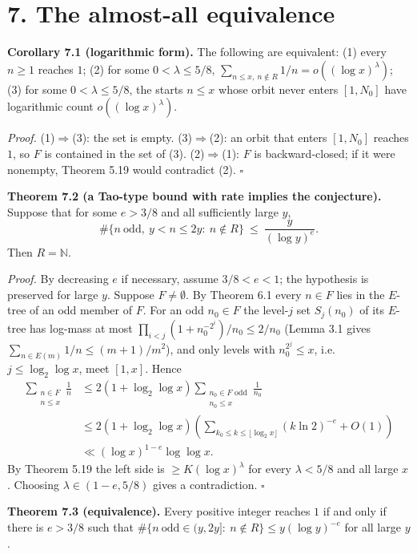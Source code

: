 \documentclass[11pt,a4paper]{article}
\begin{document}
\section{7. The almost-all
equivalence}\label{the-almost-all-equivalence}

\textbf{Corollary 7.1 (logarithmic form).} The following are equivalent:
(1) every \(n\ge 1\) reaches \(1\); (2) for some \(0<\lambda\le5/8\),
\(\sum_{n\le x,\ n\notin R}1/n=o((\log x)^{\lambda})\); (3) for some
\(0<\lambda\le5/8\), the starts \(n\le x\) whose orbit never enters
\([1,N_0]\) have logarithmic count \(o((\log x)^{\lambda})\).

\emph{Proof.} (1)\(\Rightarrow\)(3): the set is empty.
(3)\(\Rightarrow\)(2): an orbit that enters \([1,N_0]\) reaches \(1\),
so \(F\) is contained in the set of (3). (2)\(\Rightarrow\)(1): \(F\) is
backward-closed; if it were nonempty, Theorem 5.19 would contradict (2).
\(\square\)

\textbf{Theorem 7.2 (a Tao-type bound with rate implies the
conjecture).} Suppose that for some \(e>3/8\) and all sufficiently large
\(y\), \[
\#\{n\ \text{odd},\ y<n\le 2y:\ n\notin R\}\ \le\ \frac{y}{(\log y)^{e}} .
\] Then \(R=\mathbb N\).

\emph{Proof.} By decreasing \(e\) if necessary, assume \(3/8<e<1\); the
hypothesis is preserved for large \(y\). Suppose \(F\ne\emptyset\). By
Theorem 6.1 every \(n\in F\) lies in the \(E\)-tree of an odd member of
\(F\). For an odd \(n_0\in F\) the level-\(j\) set \(S_j(n_0)\) of its
\(E\)-tree has log-mass at most
\(\prod_{i<j}(1+n_0^{-2^i})/n_0\le 2/n_0\) (Lemma 3.1 gives
\(\sum_{n\in E(m)}1/n\le(m+1)/m^2\)), and only levels with
\(n_0^{2^j}\le x\), i.e.~\(j\le\log_2\log x\), meet \([1,x]\). Hence \[
\begin{aligned}
\sum_{\substack{n\in F\\n\le x}}\frac1n
&\le2(1+\log_2\log x)
 \sum_{\substack{n_0\in F\text{ odd}\\n_0\le x}}\frac1{n_0}\\
&\le2(1+\log_2\log x)
 \left(\sum_{k_0\le k\le\lfloor\log_2x\rfloor}(k\ln2)^{-e}+O(1)\right)\\
&\ll(\log x)^{1-e}\log\log x.
\end{aligned}
\] By Theorem 5.19 the left side is \(\ge K(\log x)^{\lambda}\) for
every \(\lambda<5/8\) and all large \(x\). Choosing
\(\lambda\in(1-e,5/8)\) gives a contradiction. \(\square\)

\textbf{Theorem 7.3 (equivalence).} Every positive integer reaches \(1\)
if and only if there is \(e>3/8\) such that
\(\#\{n\ \text{odd}\in(y,2y]:\ n\notin R\}\le y(\log y)^{-e}\) for all
large \(y\).
\end{document}
